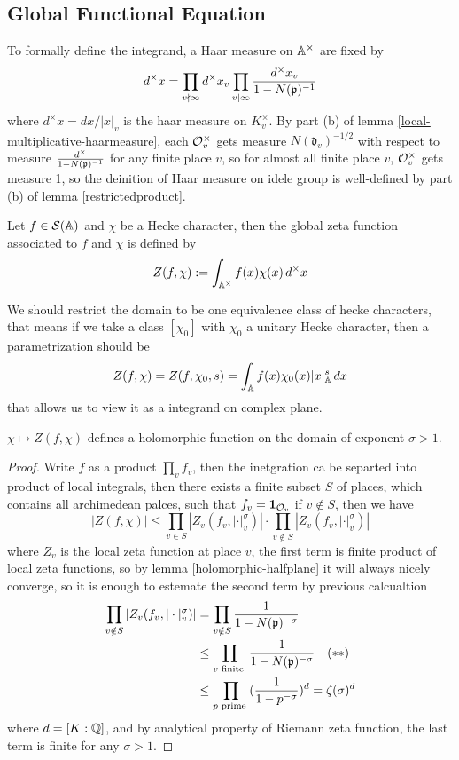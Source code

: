 \subsection{Global Functional Equation}

To formally define the integrand, a Haar measure on \(\mathbb{A}^\times\) are fixed by
\[d^\times x = \prod_{v \nmid \infty } d^\times x_v  \prod_{v \mid \infty} \frac{d^\times x_v}{1-N(\mathfrak{p})^{-1}}\]
where \(d^\times x = dx/|x|_v\) is the haar measure on \(K_v^\times\). By part (b) of lemma \ref{local-multiplicative-haarmeasure}, each \(\mathcal{O}_v^\times\) gets measure \(N(\mathfrak{d}_v)^{-1/2}\) with respect to measure \(\frac{d^\times}{1-N(\mathfrak{p})^{-1}}\) for any finite place \(v\), so for almost all finite place \(v\), \(\mathcal{O}_v^\times\) gets measure 1, so the deinition of Haar measure on idele group is well-defined by part (b) of lemma \ref{restrictedproduct}.

\begin{definition}
    Let \(f \in \mathcal{S}(\mathbb{A})\) and \(\chi\) be a Hecke character, then the global zeta function associated to \(f\) and \(\chi\) is defined by
    \[Z(f,\chi) : = \int_{\mathbb{A}^\times} f(x) \chi(x) \, d^\times x\]
\end{definition}

We should restrict the domain to be one equivalence class of hecke characters, that means if we take a class \([\chi_0]\) with \(\chi_0\) a unitary Hecke character, then a parametrization should be
\[Z(f,\chi) = Z(f,\chi_0,s) = \int_{\mathbb{A}}f(x)\chi_0(x) |x|^s_{\mathbb{A}} \, dx\]
that allows us to view it as a integrand on complex plane.

\begin{lemma}
    \(\chi \mapsto Z(f,\chi)\) defines a holomorphic function on the domain of exponent \(\sigma > 1\). 
\end{lemma}


\begin{proof}
    Write \(f\) as a product \(\prod_v f_v\), then the inetgration ca be separted into product of local integrals, then there exists a finite subset \(S\) of places, which contains all archimedean palces, such that \(f_v = \mathbf{1}_{\mathcal{O}_v}\) if \(v \notin S\), then we have
    \[|Z(f,\chi)| \leq \prod_{v \in S}|Z_v(f_v,|\cdot|_v^\sigma)| \cdot \prod_{v \notin S}|Z_v(f_v,|\cdot|_v^\sigma)|\]
    where \(Z_v\) is the local zeta function at place \(v\), the first term is finite product of local zeta functions, so by lemma \ref{holomorphic-halfplane} it will always nicely converge, so it is enough to estemate the second term by previous calcualtion
    \begin{align*}
    \prod_{v \notin S}|Z_v(f_v,|\cdot|_v^\sigma)| &= \prod_{v \notin S}\frac{1}{1-N(\mathfrak{p})^{-\sigma}}\\
     &\leq \prod_{v \text{ finite }}\frac{1}{1-N(\mathfrak{p})^{-\sigma}}  \quad (**)\\
     &\leq \prod_{p \text{ prime }}(\frac{1}{1-p^{-\sigma}})^d = \zeta(\sigma)^d 
    \end{align*}
    where \(d = [K:\mathbb{Q}]\), and by analytical property of Riemann zeta function, the last term is finite for any \(\sigma>1\).
\end{proof}

